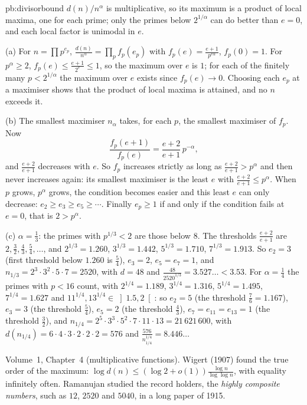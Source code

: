 \begin{solution}{pb:divisorbound}
\idea $d(n)/n^\alpha$ is multiplicative, so its maximum is a product of local maxima, one for each prime; only the primes below
$2^{1/\alpha}$ can do better than $e=0$, and each local factor is unimodal in $e$.

\writeup (a) For $n=\prod p^{e_p}$, $\frac{d(n)}{n^\alpha}=\prod_pf_p(e_p)$ with $f_p(e)=\frac{e+1}{p^{e\alpha}}$, $f_p(0)=1$. For $p^\alpha\ge2$, $f_p(e)\le\frac{e+1}{2^e}\le1$,
so the maximum over $e$ is $1$; for each of the finitely many $p<2^{1/\alpha}$ the maximum over $e$ exists since $f_p(e)\to0$. Choosing each $e_p$ at
a maximiser shows that the product of local maxima is attained, and no $n$ exceeds it.

(b) The smallest maximiser $n_\alpha$ takes, for each $p$, the smallest maximiser of $f_p$. Now
\[
\frac{f_p(e+1)}{f_p(e)}=\frac{e+2}{e+1}\,p^{-\alpha},
\]
and $\frac{e+2}{e+1}$ decreases with $e$. So $f_p$ increases strictly as long as $\frac{e+2}{e+1}>p^\alpha$ and then never increases again: its
smallest maximiser is the least $e$ with $\frac{e+2}{e+1}\le p^\alpha$. When $p$ grows, $p^\alpha$ grows, the condition becomes easier and
this least $e$ can only decrease: $e_2\ge e_3\ge e_5\ge\cdots$. Finally $e_p\ge1$ if and only if the condition fails at $e=0$, that is $2>p^\alpha$.

(c) $\alpha=\frac13$: the primes with $p^{1/3}<2$ are those below $8$. The thresholds $\frac{e+2}{e+1}$ are $2,\frac32,\frac43,\frac54,\dots$, and
$2^{1/3}=1.260$, $3^{1/3}=1.442$, $5^{1/3}=1.710$, $7^{1/3}=1.913$. So $e_2=3$ (first threshold below $1.260$ is $\frac54$), $e_3=2$, $e_5=e_7=1$, and
$n_{1/3}=2^3\cdot3^2\cdot5\cdot7=2520$, with $d=48$ and $\frac{48}{2520^{1/3}}=3.527\ldots<3.53$.
For $\alpha=\frac14$ the primes with $p<16$ count, with $2^{1/4}=1.189$, $3^{1/4}=1.316$, $5^{1/4}=1.495$, $7^{1/4}=1.627$ and
$11^{1/4},13^{1/4}\in\left]1.5,2\right[$: so $e_2=5$ (the threshold $\frac76=1.167$), $e_3=3$ (the threshold $\frac54$), $e_5=2$ (the
threshold $\frac43$), $e_7=e_{11}=e_{13}=1$ (the threshold $\frac32$), and $n_{1/4}=2^5\cdot3^3\cdot5^2\cdot7\cdot11\cdot13=21\,621\,600$, with
$d(n_{1/4})=6\cdot4\cdot3\cdot2\cdot2\cdot2=576$ and $\frac{576}{n_{1/4}^{1/4}}=8.446\ldots$

\tools Volume~1, Chapter~4 (multiplicative functions).
\leads Wigert (1907) found the true order of the maximum: $\log d(n)\le(\log2+o(1))\frac{\log n}{\log\log n}$, with equality infinitely often.
Ramanujan studied the record holders, the \emph{highly composite numbers}, such as $12$, $2520$ and $5040$, in a long paper of 1915.
\end{solution}

